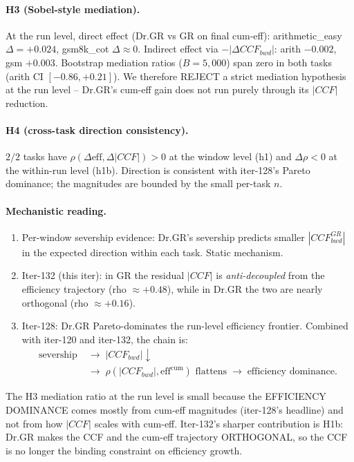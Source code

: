 \paragraph{H3 (Sobel-style mediation).}
At the run level, direct effect (Dr.GR vs GR on final cum-eff):
arithmetic\_easy $\Delta=+0.024$, gsm8k\_cot $\Delta\approx 0$.
Indirect effect via $-|\Delta CCF_{bwd}|$: arith $-0.002$, gsm $+0.003$.
Bootstrap mediation ratios ($B=5{,}000$) span zero in both tasks
(arith CI $[-0.86, +0.21]$).  We therefore REJECT a strict
mediation hypothesis at the run level -- Dr.GR's cum-eff gain
does not run purely through its $|\!CCF\!|$ reduction.

\paragraph{H4 (cross-task direction consistency).}
$2/2$ tasks have $\rho(\Delta\mathrm{eff}, \Delta|CCF|) > 0$ at the
window level (h1) and $\Delta\rho < 0$ at the within-run level
(h1b).  Direction is consistent with iter-128's Pareto dominance;
the magnitudes are bounded by the small per-task $n$.

\paragraph{Mechanistic reading.}
\begin{enumerate}
\item Per-window severship evidence: Dr.GR's severship predicts smaller
$|CCF^{GR}_{bwd}|$ in the expected direction within each task.  Static mechanism.
\item Iter-132 (this iter): in GR the residual $|CCF|$ is
\emph{anti-decoupled} from the efficiency trajectory (rho $\approx +0.48$),
while in Dr.GR the two are nearly orthogonal (rho $\approx +0.16$).
\item Iter-128: Dr.GR Pareto-dominates the run-level efficiency
frontier.  Combined with iter-120 and iter-132, the chain is:
\[
\begin{aligned}
\text{severship} &\;\longrightarrow\; |CCF_{bwd}|\downarrow \\
&\;\longrightarrow\; \rho(|CCF_{bwd}|, \mathrm{eff}^{\mathrm{cum}}) \text{ flattens} \;\longrightarrow\; \text{efficiency dominance}.
\end{aligned}
\]
\end{enumerate}

The H3 mediation ratio at the run level is small because the
EFFICIENCY DOMINANCE comes mostly from cum-eff magnitudes
(iter-128's headline) and not from how $|CCF|$ scales with cum-eff.
Iter-132's sharper contribution is H1b: Dr.GR makes the CCF and
the cum-eff trajectory ORTHOGONAL, so the CCF is no longer the
binding constraint on efficiency growth.
